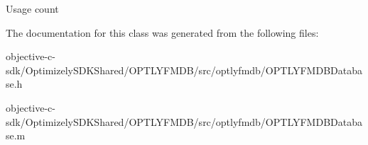 Usage count 

The documentation for this class was generated from the following files\+:\begin{DoxyCompactItemize}
\item 
objective-\/c-\/sdk/\+Optimizely\+S\+D\+K\+Shared/\+O\+P\+T\+L\+Y\+F\+M\+D\+B/src/optlyfmdb/O\+P\+T\+L\+Y\+F\+M\+D\+B\+Database.\+h\item 
objective-\/c-\/sdk/\+Optimizely\+S\+D\+K\+Shared/\+O\+P\+T\+L\+Y\+F\+M\+D\+B/src/optlyfmdb/O\+P\+T\+L\+Y\+F\+M\+D\+B\+Database.\+m\end{DoxyCompactItemize}

